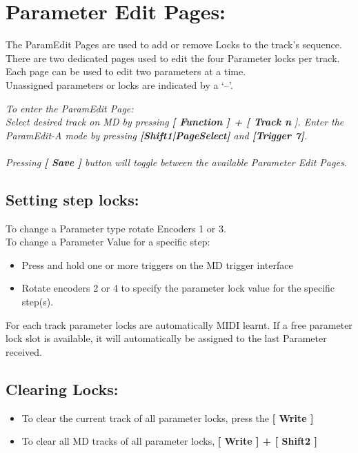 \chapter{Parameter Edit Pages:}
The ParamEdit Pages are used to add or remove Locks to the track’s sequence.
\\

There are two dedicated pages used to edit the four Parameter locks per track.\\
Each page can be used to edit two parameters at a time.
\\

Unassigned parameters or locks are indicated by a ‘--’.


\textit{To enter the ParamEdit Page:\\ Select desired track on MD by pressing \textbf{[ Function ] + [ Track n }]. Enter the ParamEdit-A mode by pressing \textbf{[Shift1|PageSelect]} and \textbf{[Trigger 7]}.}
\\\\
\textit{Pressing \textbf{[ Save ]} button will toggle between the available Parameter Edit Pages.}


\section{Setting step locks:}
To change a Parameter type rotate Encoders 1 or 3.\\
To change a Parameter Value for a specific step:
\begin{itemize}
\item Press and hold one or more triggers on the MD trigger interface
\item Rotate encoders 2 or 4 to specify the parameter lock value for the specific step(s).
\end{itemize}
For each track parameter locks are automatically MIDI learnt. If a free parameter lock slot is available, it will automatically be assigned to the last Parameter received. 
\section{Clearing Locks:}
\begin{itemize}
\item To clear the current track of all parameter locks, press the \textbf{[ Write  ]}
\item To clear all MD tracks of all parameter locks, \textbf{[ Write ] + [ Shift2 ]}
\end{itemize}